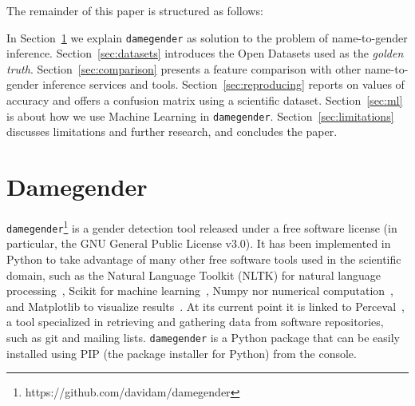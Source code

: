 \documentclass[a4paper]{article}
\begin{document}
%

The remainder of this paper is structured as follows:

In Section~\ref{sec:damegender} we explain \texttt{damegender} as solution to the problem of name-to-gender inference.
Section~\ref{sec:datasets} introduces the Open Datasets used as the \emph{golden truth}.
Section~\ref{sec:comparison} presents a feature comparison with other name-to-gender inference services and tools.
Section~\ref{sec:reproducing} reports on values of accuracy and offers a confusion matrix using a scientific dataset.
Section~\ref{sec:ml} is about how we use Machine Learning in \texttt{damegender}.
Section~\ref{sec:limitations} discusses limitations and further research, and concludes the paper.

\section{Damegender}
\label{sec:damegender}

\texttt{damegender}\footnote{https://github.com/davidam/damegender} is a gender detection tool released under a free software license (in particular, the GNU General Public License v3.0). 
It has been implemented in Python to take advantage of many other free software tools used in the scientific domain, such as the Natural Language Toolkit (NLTK) for natural language processing~\cite{loper2002nltk}, Scikit for machine learning~\cite{pedregosa2011scikit}, Numpy nor numerical computation~\cite{van2011numpy}, and Matplotlib to visualize results~\cite{hunter2007matplotlib}. 
At its current point it is linked to Perceval~\cite{duenas2018perceval}, a tool specialized in retrieving and gathering data from software repositories, such as git and mailing lists.
\texttt{damegender} is a Python package that can be easily installed using PIP (the package installer for Python) from the console.
\end{document}
